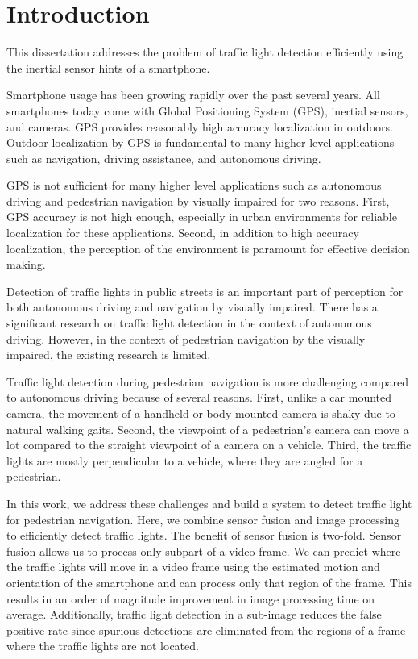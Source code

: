 \chapter{Introduction}

This dissertation addresses the problem of traffic light detection efficiently using the inertial sensor hints of a smartphone.

Smartphone usage has been growing rapidly over the past several years. 
All smartphones today come with Global Positioning System (GPS), inertial sensors, and cameras. 
GPS provides reasonably high accuracy localization in outdoors. 
Outdoor localization by GPS is fundamental to many higher level applications such as navigation, driving assistance, and autonomous driving.

GPS is not sufficient for many higher level applications such as autonomous driving and pedestrian navigation by visually impaired for two reasons.
First, GPS accuracy is not high enough, especially in urban environments for reliable localization for these applications. 
Second, in addition to high accuracy localization, the perception of the environment is paramount for effective decision making. 

Detection of traffic lights in public streets is an important part of perception for both autonomous driving and navigation by visually impaired.  
There has a significant research \cite{traffic_google} on traffic light detection in the context of autonomous driving. 
However, in the context of pedestrian navigation by the visually impaired, the existing research is limited. 

Traffic light detection during pedestrian navigation is more challenging compared to autonomous driving because of several reasons. 
First, unlike a car mounted camera, the movement of a handheld or body-mounted camera is shaky due to natural walking gaits. 
Second, the viewpoint of a pedestrian's camera can move a lot compared to the straight viewpoint of a camera on a vehicle.
Third, the traffic lights are mostly perpendicular to a vehicle, where they are angled for a pedestrian. 

In this work, we address these challenges and build a system to detect traffic light for pedestrian navigation.
Here, we combine sensor fusion and image processing to efficiently detect traffic lights. 
The benefit of sensor fusion is two-fold.
Sensor fusion allows us to process only subpart of a video frame.
We can predict where the traffic lights will move in a video frame using the estimated motion and orientation of the smartphone and can process only that region of the frame. 
This results in an order of magnitude improvement in image processing time on average. 
Additionally, traffic light detection in a sub-image reduces the false positive rate since spurious detections are eliminated from the regions of a frame where the traffic lights are not located.

